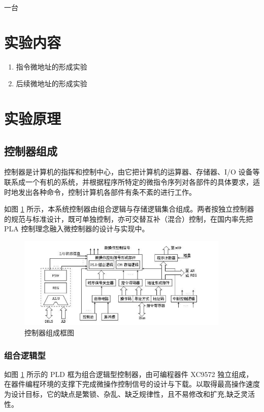 \documentclass[a4paper,10pt,UTF8]{paper}
\numberwithin{equation}{section}
\numberwithin{figure}{section}
\begin{document}
\dai 一台

\section{实验内容}

\begin{enumerate}
	\item 指令微地址的形成实验
	\item 后续微地址的形成实验
\end{enumerate}


\section{实验原理}

\subsection{控制器组成}

控制器是计算机的指挥和控制中心，由它把计算机的运算器、存储器、I/O 设备等联系成一个有机的系统，并根据程序所特定的微指令序列对各部件的具体要求，适时地发出各种命令，控制计算机各部件有条不紊的进行工作。

如图 \ref{fig:1} 所示，本系统控制器由组合逻辑与存储逻辑集合组成。两者按独立控制器的规范与标准设计，既可单独控制，亦可交替互补（混合）控制，在国内率先把 PLA 控制理念融入微控制器的设计与实现中。

\begin{figure}[h]
	\centering
	\includegraphics[width=0.9\textwidth]{1.PNG}
	\caption{控制器组成框图}
	\label{fig:1}
\end{figure}

\subsubsection{组合逻辑型}

如图 \ref{fig:1} 所示的 PLD 框为组合逻辑型控制器，由可编程器件 XC9572 独立组成，在器件编程环境的支撑下完成微操作控制信号的设计与下载。以取得最高操作速度为设计目标，它的缺点是繁锁、杂乱、缺乏规律性，且不易修改和扩充,缺乏灵活性。
\end{document}
